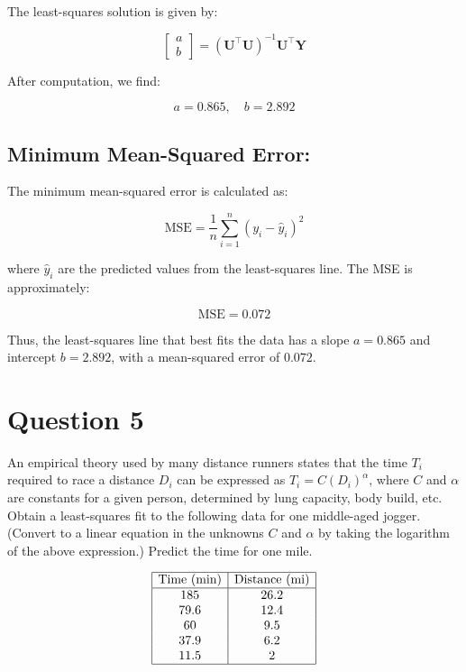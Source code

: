 \documentclass{article}
\begin{document}
The least-squares solution is given by:

\[
\begin{bmatrix} a \\ b \end{bmatrix} = (\mathbf{U}^\top \mathbf{U})^{-1} \mathbf{U}^\top \mathbf{Y}
\]

After computation, we find:

\[
a = 0.865, \quad b = 2.892
\]

\subsection{Minimum Mean-Squared Error:}

The minimum mean-squared error is calculated as:

\[
\text{MSE} = \frac{1}{n} \sum_{i=1}^{n} (y_i - \hat{y}_i)^2
\]

where \( \hat{y}_i \) are the predicted values from the least-squares line. The MSE is approximately:

\[
\text{MSE} = 0.072
\]

Thus, the least-squares line that best fits the data has a slope \( a = 0.865 \) and intercept \( b = 2.892 \), with a mean-squared error of \( 0.072 \).

\section{Question 5}

An empirical theory used by many distance runners states that the time \( T_i \) required to race a distance \( D_i \) can be expressed as \( T_i = C(D_i)^\alpha \), where \( C \) and \( \alpha \) are constants for a given person, determined by lung capacity, body build, etc. Obtain a least-squares fit to the following data for one middle-aged jogger. (Convert to a linear equation in the unknowns \( C \) and \( \alpha \) by taking the logarithm of the above expression.) Predict the time for one mile.

\[
\begin{array}{|c|c|}
\hline
\text{Time (min)} & \text{Distance (mi)} \\
\hline
185 & 26.2 \\
79.6 & 12.4 \\
60 & 9.5 \\
37.9 & 6.2 \\
11.5 & 2 \\
\hline
\end{array}
\]
\end{document}
